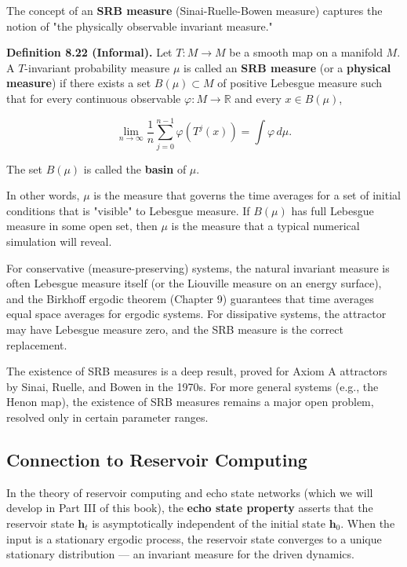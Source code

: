 The concept of an \textbf{SRB measure} (Sinai-Ruelle-Bowen measure) captures the notion of "the physically observable invariant measure."

\textbf{Definition 8.22 (Informal).} Let $T: M \to M$ be a smooth map on a manifold $M$. A $T$-invariant probability measure $\mu$ is called an \textbf{SRB measure} (or a \textbf{physical measure}) if there exists a set $B(\mu) \subset M$ of positive Lebesgue measure such that for every continuous observable $\varphi: M \to \mathbb{R}$ and every $x \in B(\mu)$,

\[
\lim_{n \to \infty} \frac{1}{n} \sum_{j=0}^{n-1} \varphi(T^j(x)) = \int \varphi \, d\mu.
\]

The set $B(\mu)$ is called the \textbf{basin} of $\mu$.

In other words, $\mu$ is the measure that governs the time averages for a set of initial conditions that is "visible" to Lebesgue measure. If $B(\mu)$ has full Lebesgue measure in some open set, then $\mu$ is the measure that a typical numerical simulation will reveal.

\begin{remark}
For conservative (measure-preserving) systems, the natural invariant measure is often Lebesgue measure itself (or the Liouville measure on an energy surface), and the Birkhoff ergodic theorem (Chapter 9) guarantees that time averages equal space averages for ergodic systems. For dissipative systems, the attractor may have Lebesgue measure zero, and the SRB measure is the correct replacement.
\end{remark}


\begin{remark}
The existence of SRB measures is a deep result, proved for Axiom A attractors by Sinai, Ruelle, and Bowen in the 1970s. For more general systems (e.g., the Henon map), the existence of SRB measures remains a major open problem, resolved only in certain parameter ranges.
\end{remark}


\subsection{Connection to Reservoir Computing}\label{sec:8.4.3}

In the theory of reservoir computing and echo state networks (which we will develop in Part III of this book), the \textbf{echo state property} asserts that the reservoir state $\mathbf{h}_t$ is asymptotically independent of the initial state $\mathbf{h}_0$. When the input is a stationary ergodic process, the reservoir state converges to a unique stationary distribution --- an invariant measure for the driven dynamics.

